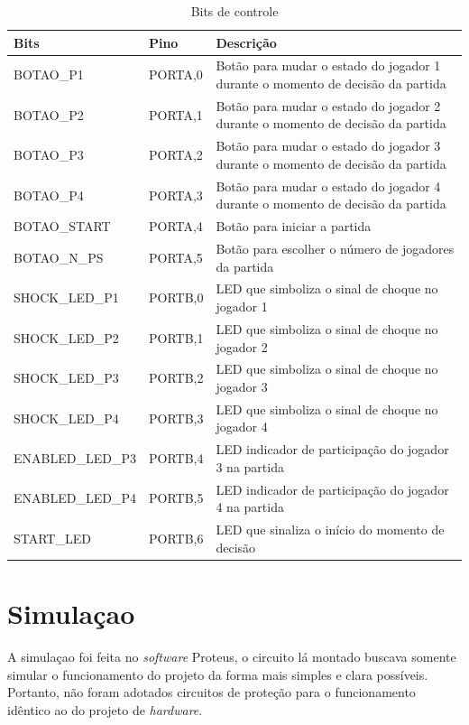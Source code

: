 \documentclass[article]{IEEEtran}
\begin{document}
\begin{table}
  \centering
  \caption{Bits de controle}
  \vspace{0.5cm}
  \label{tab:bits}
  \begin{tabular}{|p{2.3cm}|p{1cm}|p{4cm}|}\hline
    Bits 		& Pino		& Descrição						\\ \hline
    BOTAO\_P1		& PORTA,0	& Botão para mudar o estado do jogador 1 durante
					  o momento de decisão da partida			\\ \hline
    BOTAO\_P2		& PORTA,1	& Botão para mudar o estado do jogador 2 durante
					  o momento de decisão da partida			\\ \hline
    BOTAO\_P3		& PORTA,2	& Botão para mudar o estado
				   	do jogador 3 durante
					o momento de decisão da partida			\\ \hline
    BOTAO\_P4		& PORTA,3	& Botão para mudar o estado do jogador 4 durante o momento de decisão da partida			\\ \hline
    BOTAO\_START	& PORTA,4	& Botão para iniciar a partida				\\ \hline
    BOTAO\_N\_PS	& PORTA,5	& Botão para escolher o número de jogadores da partida	\\ \hline
    SHOCK\_LED\_P1	& PORTB,0	& LED que simboliza o sinal de choque no jogador 1	\\ \hline
    SHOCK\_LED\_P2	& PORTB,1	& LED que simboliza o sinal de choque no jogador 2	\\ \hline
    SHOCK\_LED\_P3	& PORTB,2	& LED que simboliza o sinal de choque no jogador 3	\\ \hline
    SHOCK\_LED\_P4	& PORTB,3	& LED que simboliza o sinal de choque no jogador 4	\\ \hline
    ENABLED\_LED\_P3	& PORTB,4	& LED indicador de participação do jogador 3 na partida	\\ \hline
    ENABLED\_LED\_P4	& PORTB,5	& LED indicador de participação do jogador 4 na partida	\\ \hline
    START\_LED		& PORTB,6	& LED que sinaliza o início do momento de decisão	\\ \hline
  \end{tabular}
\end{table}

\section{Simulaçao}
A simulaçao foi feita no \textit{software} Proteus, o circuito lá montado buscava somente simular o funcionamento do projeto da forma mais simples e clara possíveis. Portanto, não foram adotados circuitos de proteção para o funcionamento idêntico ao do projeto de \textit{hardware}. 
\end{document}
